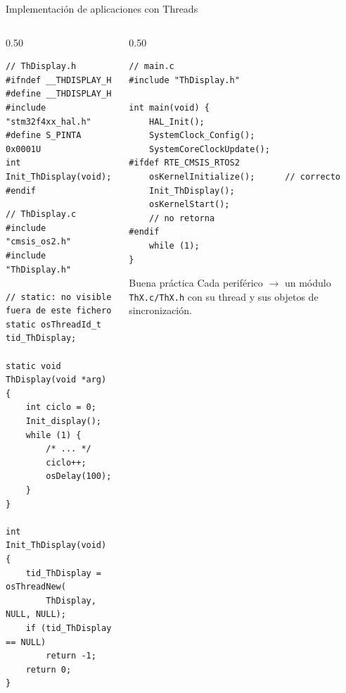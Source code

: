 \begin{frame}[fragile]{Implementación de aplicaciones con Threads}
    \begin{columns}
        \begin{column}{0.50\textwidth}
            \begin{verbatim}
// ThDisplay.h
#ifndef __THDISPLAY_H
#define __THDISPLAY_H
#include "stm32f4xx_hal.h"
#define S_PINTA  0x0001U
int Init_ThDisplay(void);
#endif
            \end{verbatim}
            \begin{verbatim}
// ThDisplay.c
#include "cmsis_os2.h"
#include "ThDisplay.h"

// static: no visible fuera de este fichero
static osThreadId_t tid_ThDisplay;

static void ThDisplay(void *arg) {
    int ciclo = 0;
    Init_display();
    while (1) {
        /* ... */
        ciclo++;
        osDelay(100);
    }
}

int Init_ThDisplay(void) {
    tid_ThDisplay = osThreadNew(
        ThDisplay, NULL, NULL);
    if (tid_ThDisplay == NULL)
        return -1;
    return 0;
}
            \end{verbatim}
        \end{column}
        \begin{column}{0.50\textwidth}
            \begin{verbatim}
// main.c
#include "ThDisplay.h"

int main(void) {
    HAL_Init();
    SystemClock_Config();
    SystemCoreClockUpdate();
#ifdef RTE_CMSIS_RTOS2
    osKernelInitialize();      // correcto
    Init_ThDisplay();
    osKernelStart();
    // no retorna
#endif
    while (1);
}
            \end{verbatim}
            \begin{block}{Buena práctica}
                Cada periférico $\rightarrow$ un módulo
                \texttt{ThX.c/ThX.h} con su thread
                y sus objetos de sincronización.
            \end{block}
        \end{column}
    \end{columns}
\end{frame}


